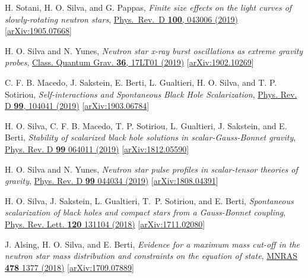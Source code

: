 \documentclass[11pt]{article}
\begin{document}
\begin{etaremune}[
        start=\value{pubCounter},
        topsep=0pt,
        partopsep=0pt]
    \item \label{itm:pp_fs}
    H. Sotani, H. O. Silva, and G. Pappas,
    \emph{Finite size effects on the light curves of slowly-rotating neutron stars},
    \href{https://journals.aps.org/prd/abstract/10.1103/PhysRevD.100.043006}{Phys.~Rev.~D {\bf 100}, 043006 (2019)}
    [\href{https://arxiv.org/abs/1905.07668}{arXiv:1905.07668}]

    \item H. O. Silva and N. Yunes,
    \emph{Neutron star x-ray burst oscillations as extreme gravity probes},
    \href{https://iopscience.iop.org/article/10.1088/1361-6382/ab3560}{Class. Quantum Grav. {\bf 36}, 17LT01 (2019)}
    [\href{https://arxiv.org/abs/1902.10269}{arXiv:1902.10269}]

    \item C. F. B. Macedo, J. Sakstein, E. Berti, L. Gualtieri, H. O. Silva, and T. P. Sotiriou,
    \emph{Self-interactions and Spontaneous Black Hole Scalarization},
    \href{https://journals.aps.org/prd/abstract/10.1103/PhysRevD.99.104041}{Phys. Rev. D {\bf 99}, 104041 (2019)}
    [\href{https://arxiv.org/abs/1903.06784}{arXiv:1903.06784}]

    \item H. O. Silva, C. F. B. Macedo, T. P. Sotiriou, L. Gualtieri,
    	  J. Sakstein, and E. Berti,
	\emph{Stability of scalarized black hole solutions in scalar-Gauss-Bonnet gravity},
	\href{https://journals.aps.org/prd/abstract/10.1103/PhysRevD.99.064011}{Phys. Rev. D {\bf99} 064011 (2019)}
	[\href{https://arxiv.org/abs/1812.05590}{arXiv:1812.05590}]

    \item H. O. Silva and N. Yunes,
    \emph{Neutron star pulse profiles in scalar-tensor theories of gravity},
    \href{http://iopscience.iop.org/article/10.1088/1361-6382/aa995a}{Phys. Rev. D {\bf99} 044034 (2019)}
    [\href{https://arxiv.org/abs/1808.04391}{arXiv:1808.04391}]

    \item \label{itm:edgb_sca} H. O. Silva, J. Sakstein, L. Gualtieri, T.~P. Sotiriou, and E. Berti,
    \emph{Spontaneous scalarization of black holes and compact stars from a Gauss-Bonnet coupling},
    \href{https://journals.aps.org/prl/abstract/10.1103/PhysRevLett.120.131104}{Phys. Rev. Lett. {\bf120} 131104 (2018)}
    [\href{https://arxiv.org/abs/1711.02080}{arXiv:1711.02080}]

    \item J. Alsing, H. O. Silva, and E. Berti,
    \emph{Evidence for a maximum mass cut-off in the neutron star mass distribution and constraints on the equation of state},
    \href{https://academic.oup.com/mnras/article-abstract/478/1/1377/4987228?redirectedFrom=fulltext}{MNRAS {\bf478} 1377 (2018)}
    [\href{https://arxiv.org/abs/1709.07889}{arXiv:1709.07889}]


\end{etaremune}
\end{document}
